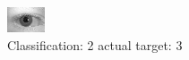 \begin{figure}[h!]
\begin{center}
\includegraphics[width=0.60\columnwidth]{figures/ID658_class_2_target_3.png}
\end{center}
\caption{ Classification: 2 actual target: 3}
\label{fig:ID658_class_2_target_3}
\end{figure}
